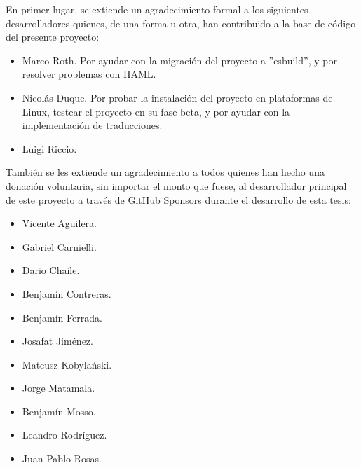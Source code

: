 En primer lugar, se extiende un agradecimiento formal a los siguientes desarrolladores quienes, de una forma u otra, han contribuido a la base de código del presente proyecto:
\begin{itemize}
	\item Marco Roth. Por ayudar con la migración del proyecto a ''esbuild'', y por resolver problemas con HAML.
	\item Nicolás Duque. Por probar la instalación del proyecto en plataformas de Linux, testear el proyecto en su fase beta, y por ayudar con la implementación de traducciones.
	\item Luigi Riccio.
\end{itemize}

También se les extiende un agradecimiento a todos quienes han hecho una donación voluntaria, sin importar el monto que fuese, al desarrollador principal de este proyecto a través de GitHub Sponsors durante el desarrollo de esta tesis:
\begin{itemize}
	\item Vicente Aguilera.
	\item Gabriel Carnielli.
	\item Dario Chaile.
	\item Benjamín Contreras.
	\item Benjamín Ferrada.
	\item Josafat Jiménez.
	\item  Mateusz Kobylański.
	\item Jorge Matamala.
	\item Benjamín Mosso.
	\item Leandro Rodríguez.
	\item Juan Pablo Rosas.
\end{itemize}
